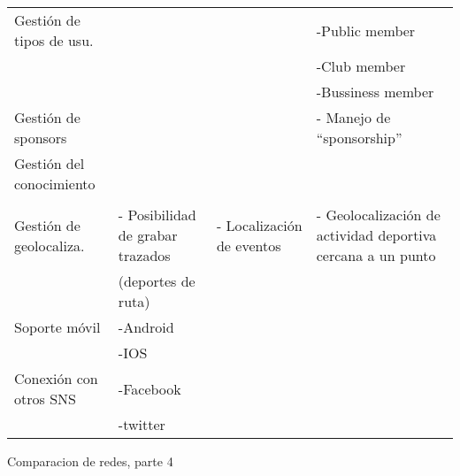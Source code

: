 \begin{landscape}
\begin{table}
\begin{center}
{\begin{tabular}{|p{4cm}|p{7cm}p{6cm}p{9cm}|}
Gestión de tipos de usu. &  &  & -Public member \\ 
 &  &  & -Club member \\ 
 &  &  & -Bussiness member \\ 
\hline
Gestión de sponsors &  &  & - Manejo de ``sponsorship'' \\ 
\hline
Gestión del conocimiento &  &  &  \\ 
 &  &  &  \\ 
\hline
Gestión de geolocaliza. & - Posibilidad de grabar trazados & - Localización de eventos & - Geolocalización de actividad deportiva cercana a un punto \\ 
 & (deportes de ruta) &  &  \\ 
\hline
Soporte móvil & -Android &  &  \\ 
 & -IOS &  &  \\ 
\hline
Conexión con otros SNS & -Facebook &  &  \\ 
 & -twitter &  &  \\ 
\hline
\end{tabular}
}
  
  \end{center}
\end{table}

\newpage

\begin{table}
  \caption{Comparacion de redes, parte 4}
  \label{tab:comparacion_redes_4}


\end{table}
\end{landscape}
